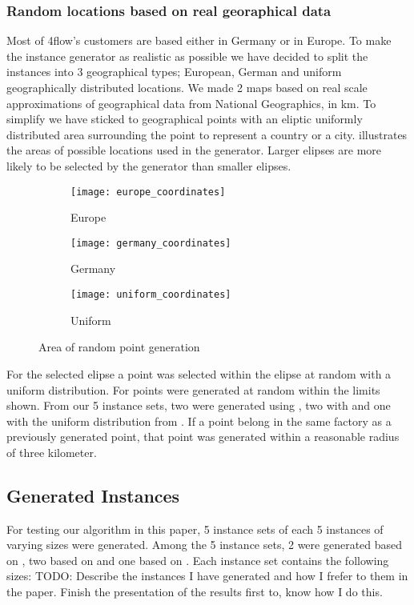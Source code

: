 \documentclass[../main.tex]{subfiles}
\begin{document}
\subsubsection{Random locations based on real georaphical data}
Most of 4flow's customers are based either in Germany or in Europe. 
To make the instance generator as realistic as possible we have decided to split the instances into 3 geographical types; 
European, German and uniform geographically distributed locations.
We made 2 maps based on real scale approximations of geographical data from National Geographics, in km.
To simplify we have sticked to geographical points with an eliptic uniformly distributed area surrounding the point to represent a country or a city.
 illustrates the areas of possible locations used in the generator. 
Larger elipses are more likely to be selected by the generator than smaller elipses.
\begin{figure}
\centering
    \begin{subfigure}[b]{0.3\textwidth}
        \centering
        \texttt{[image: europe\_coordinates]}
        \caption{Europe}
        \label{fig:eur}
    \end{subfigure}
    \hfill
    \begin{subfigure}[b]{0.3\textwidth}
        \centering
        \texttt{[image: germany\_coordinates]}
        \caption{Germany}
        \label{fig:ger}
    \end{subfigure}
    \hfill
    \begin{subfigure}[b]{0.3\textwidth}
        \centering
        \texttt{[image: uniform\_coordinates]}
        \caption{Uniform}
        \label{fig:uni}
    \end{subfigure}
    \caption{Area of random point generation}
    \label{fig:areas}
\end{figure}

For the selected elipse a point was selected within the elipse at random with a uniform distribution.
For  points were generated at random within the limits shown.
From our 5 instance sets, two were generated using , two with  and one with the uniform distribution from . 
If a point belong in the same factory as a previously generated point, that point was generated within a reasonable radius of three kilometer.

\subsection{Generated Instances}
\label{sec:geni}
For testing our algorithm in this paper, 5 instance sets of each 5 instances of varying sizes were generated. Among the 5 instance sets, 2 were generated based on , two based on  and one based on . Each instance set contains the following sizes:
TODO: Describe the instances I have generated and how I frefer to them in the paper. 
Finish the presentation of the results first to, know how I do this.
\end{document}

